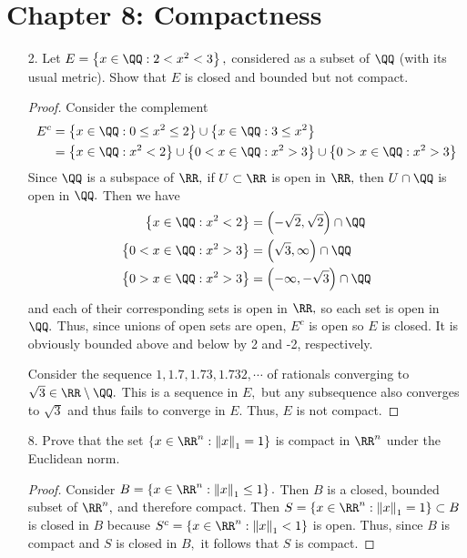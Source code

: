 \documentclass{article}
\begin{document}
\section*{Chapter 8: Compactness}

\begin{itemize}
	\item[2.] Let $E=\left\{ x\in\QQ:2<x^2<3 \right\},$ considered as a subset of $\QQ$ (with its usual metric). Show that $E$ is closed and bounded but not compact.
		\begin{proof}
			Consider the complement 
			\begin{align*}
				E^c &= \left\{ x\in\QQ: 0\le x^2 \le 2 \right\} \cup \left\{ x\in\QQ: 3\le x^2 \right\} \\
				&= \left\{ x\in\QQ: x^2<2 \right\}\cup \left\{ 0<x\in\QQ: x^2 > 3 \right\}\cup \left\{ 0 > x\in\QQ: x^2 > 3 \right\}
			\end{align*}
			Since $\QQ$ is a subspace of $\RR,$ if $U\subset \RR$ is open in $\RR,$ then $U\cap\QQ$ is open in $\QQ.$ Then we have
			\begin{align*}
				\left\{ x\in\QQ: x^2<2 \right\} &= \left( -\sqrt{2}, \sqrt{2} \right)\cap \QQ \\
				\left\{ 0<x\in\QQ: x^2>3 \right\} &= \left( \sqrt{3}, \infty \right) \cap \QQ \\
				\left\{ 0 > x\in\QQ: x^2 > 3 \right\} &= \left( -\infty, -\sqrt{3} \right) \cap \QQ
			\end{align*}
			and each of their corresponding sets is open in $\RR,$ so each set is open in $\QQ.$ Thus, since unions of open sets are open, $E^c$ is open so $E$ is closed. It is obviously bounded above and below by 2 and -2, respectively.

			Consider the sequence $1, 1.7, 1.73, 1.732, \cdots$ of rationals converging to $\sqrt{3}\in\RR\setminus\QQ.$ This is a sequence in $E,$ but any subsequence also converges to $\sqrt{3}$ and thus fails to converge in $E.$ Thus, $E$ is not compact.
		\end{proof}

	\item[8.] Prove that the set $\left\{ x\in\RR^n:\left\lVert x \right\rVert_1=1 \right\}$ is compact in $\RR^n$ under the Euclidean norm.
		\begin{proof}
			Consider $B=\left\{ x\in\RR^n: \left\lVert x \right\rVert_1\le 1 \right\}.$ Then $B$ is a closed, bounded subset of $\RR^n,$ and therefore compact. Then $S = \left\{ x\in\RR^n:\left\lVert x \right\rVert_1=1 \right\}\subset B$ is closed in $B$ because $S^c=\left\{ x\in\RR^n:\left\lVert x \right\rVert_1<1 \right\}$ is open. Thus, since $B$ is compact and $S$ is closed in $B,$ it follows that $S$ is compact.
		\end{proof}


\end{itemize}
\end{document}
